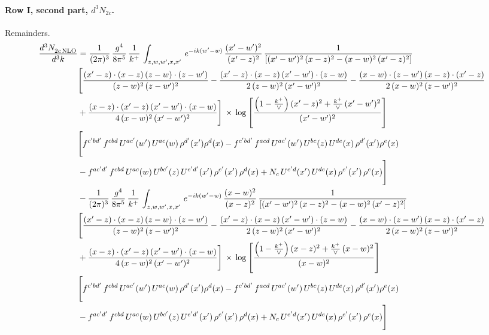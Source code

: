 \documentclass[10pt]{article}
\numberwithin{equation}{section}
\begin{document}
\paragraph{Row I, second part, $d^3N_{2c}$.}
Remainders.
\begin{align}
    \frac{d^{3}N_{2c\,\rm NLO}^{\rm}}{d^{3}k}  & =  \frac{1}{(2\pi)^{3}}\, \frac{g^{4}}{8\pi^{5}}\,\frac{1}{k^{+}}\,\int_{z,w,w^{\prime},x,x'}\, e^{-ik(w^{\prime}-w)}\,\frac{(x'-w')^{2}}{(x'-z)^{2}}\, \frac{1}{\left[(x'-w')^{2}\, (x-z)^{2} - (x-w)^{2}\, (x'-z)^{2}\right]} \notag \\ & \Bigg[\frac{(x'-z)\cdot (x-z)\, (z-w)\cdot (z-w')}{(z-w)^{2}\, (z-w')^{2}}-\frac{(x'-z)\cdot (x-z)\, (x'-w')\cdot (z-w)}{2\, (z-w)^{2}\, (x'-w')^{2}} -\frac{(x-w)\cdot (z-w')\, (x-z)\cdot (x'-z)}{2\, (x-w)^{2}\, (z-w')^{2}}\notag \\ & +\frac{(x-z)\cdot (x'-z)\, (x'-w')\cdot (x-w)}{4\, (x-w)^{2}\, (x'-w')^{2}}\Bigg]\,\times\, \log{\left[\frac{\left(1-\frac{k^{+}}{\vee}\right)(x'-z)^{2}+\frac{k^{+}}{\vee}\,(x'-w')^{2}}{(x'-w')^{2}}\right]} \notag \\ &  \Bigg[f^{c'bd'}\,f^{cbd}\, U^{ac'}(w')\,U^{ac}(w)\,\rho^{d'}(x')\rho^{d}(x)- f^{c'bd'}\,f^{acd}\,U^{ac'}(w')\,U^{bc}(z)\,U^{de}(x)\,\rho^{d'}(x')\rho^{e}(x) \notag \\ & -f^{ac'd'}\,f^{cbd}\,U^{ac}(w)\,U^{bc'}(z)\,U^{e'd'}(x')\,\rho^{e'}(x')\,\rho^{d}(x) +N_{c}\,U^{e'd}(x')\,U^{de}(x)\,\rho^{e'}(x')\,\rho^{e}(x)\Bigg] \notag \\
& -\frac{1}{(2\pi)^{3}}\, \frac{g^{4}}{8\pi^{5}}\,\frac{1}{k^{+}}\,\int_{z,w,w^{\prime},x,x'}\, e^{-ik(w^{\prime}-w)}\,\frac{(x-w)^{2}}{(x-z)^{2}}\, \frac{1}{\left[(x'-w')^{2}\, (x-z)^{2} - (x-w)^{2}\, (x'-z)^{2}\right]} \notag \\ & \Bigg[\frac{(x'-z)\cdot (x-z)\, (z-w)\cdot (z-w')}{(z-w)^{2}\, (z-w')^{2}}-\frac{(x'-z)\cdot (x-z)\, (x'-w')\cdot (z-w)}{2\, (z-w)^{2}\, (x'-w')^{2}} -\frac{(x-w)\cdot (z-w')\, (x-z)\cdot (x'-z)}{2\, (x-w)^{2}\, (z-w')^{2}}\notag \\ & +\frac{(x-z)\cdot (x'-z)\, (x'-w')\cdot (x-w)}{4\, (x-w)^{2}\, (x'-w')^{2}}\Bigg]\,\times\, \log{\left[\frac{\left(1-\frac{k^{+}}{\vee}\right)(x-z)^{2}+\frac{k^{+}}{\vee}\,(x-w)^{2}}{(x-w)^{2}}\right]} \notag \\ &  \Bigg[f^{c'bd'}\,f^{cbd}\, U^{ac'}(w')\,U^{ac}(w)\,\rho^{d'}(x')\rho^{d}(x)- f^{c'bd'}\,f^{acd}\,U^{ac'}(w')\,U^{bc}(z)\,U^{de}(x)\,\rho^{d'}(x')\rho^{e}(x) \notag \\ & -f^{ac'd'}\,f^{cbd}\,U^{ac}(w)\,U^{bc'}(z)\,U^{e'd'}(x')\,\rho^{e'}(x')\,\rho^{d}(x) +N_{c}\,U^{e'd}(x')\,U^{de}(x)\,\rho^{e'}(x')\,\rho^{e}(x)\Bigg] \label{eq:R:G2I2c}
\end{align}
\end{document}
